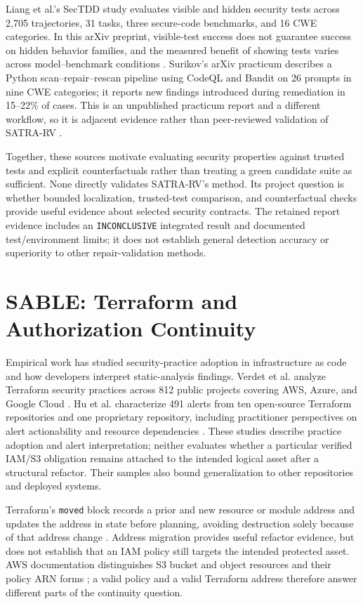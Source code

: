 Liang et al.'s SecTDD study evaluates visible and hidden security tests across 2,705 trajectories, 31 tasks, three secure-code benchmarks, and 16 CWE categories. In this arXiv preprint, visible-test success does not guarantee success on hidden behavior families, and the measured benefit of showing tests varies across model--benchmark conditions \cite{liang2026sectdd}. Surikov's arXiv practicum describes a Python scan--repair--rescan pipeline using CodeQL and Bandit on 26 prompts in nine CWE categories; it reports new findings introduced during remediation in 15--22\% of cases. This is an unpublished practicum report and a different workflow, so it is adjacent evidence rather than peer-reviewed validation of SATRA-RV \cite{surikov2026jit}.

Together, these sources motivate evaluating security properties against trusted tests and explicit counterfactuals rather than treating a green candidate suite as sufficient. None directly validates SATRA-RV's method. Its project question is whether bounded localization, trusted-test comparison, and counterfactual checks provide useful evidence about selected security contracts. The retained report evidence includes an \texttt{INCONCLUSIVE} integrated result and documented test/environment limits; it does not establish general detection accuracy or superiority to other repair-validation methods.

\section{SABLE: Terraform and Authorization Continuity}
Empirical work has studied security-practice adoption in infrastructure as code and how developers interpret static-analysis findings. Verdet et al. analyze Terraform security practices across 812 public projects covering AWS, Azure, and Google Cloud \cite{verdet2025terraform}. Hu et al. characterize 491 alerts from ten open-source Terraform repositories and one proprietary repository, including practitioner perspectives on alert actionability and resource dependencies \cite{hu2023alerts}. These studies describe practice adoption and alert interpretation; neither evaluates whether a particular verified IAM/S3 obligation remains attached to the intended logical asset after a structural refactor. Their samples also bound generalization to other repositories and deployed systems.

Terraform's \texttt{moved} block records a prior and new resource or module address and updates the address in state before planning, avoiding destruction solely because of that address change \cite{hashicorpMoved}. Address migration provides useful refactor evidence, but does not establish that an IAM policy still targets the intended protected asset. AWS documentation distinguishes S3 bucket and object resources and their policy ARN forms \cite{awsS3Policy}; a valid policy and a valid Terraform address therefore answer different parts of the continuity question.


